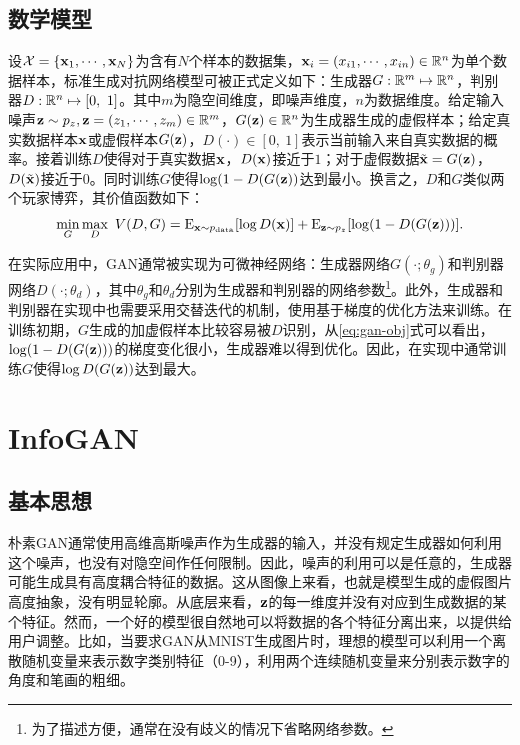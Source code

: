 \subsection{数学模型}
设$\mathcal{X} = \{\mathbf{x}_1, \cdots, \mathbf{x}_N\}$为含有$N$个样本的数据集，$\mathbf{x}_i = (x_{i1}, \cdots, x_{in}) \in \mathbb{R}^n$为单个数据样本，标准生成对抗网络模型可被正式定义如下：生成器$G: \mathbb{R}^m \mapsto \mathbb{R}^n$，判别器$D: \mathbb{R}^n \mapsto [0, ~1]$。其中$m$为隐空间维度，即噪声维度，$n$为数据维度。给定输入噪声$\mathbf{z} \sim p_z, \mathbf{z} = (z_1, \cdots, z_m) \in \mathbb{R}^m$，$G(\mathbf{z}) \in \mathbb{R}^n$为生成器生成的虚假样本；给定真实数据样本$\mathbf{x}$或虚假样本$G(\mathbf{z})$，$D(\cdot) \in [0,~1]$表示当前输入来自真实数据的概率。接着训练$D$使得对于真实数据$\mathbf{x}$，$D(\mathbf{x})$接近于$1$；对于虚假数据$\tilde{\mathbf{x}} = G(\mathbf{z})$，$D(\tilde{\mathbf{x}})$接近于$0$。同时训练$G$使得$\log(1 - D(G(\mathbf{z}))$达到最小。换言之，$D$和$G$类似两个玩家博弈，其价值函数如下：
\begin{equation}
  \min_G\max_D ~V(D,G) =
    \text{E}_{\mathbf{x} \sim p_{\text{data}}}[\log D(\mathbf{x})] + 
    \text{E}_{\mathbf{z} \sim p_z}[\log(1-D(G(\mathbf{z})))].
  \label{eq:gan-obj}
\end{equation}

在实际应用中，GAN通常被实现为可微神经网络：生成器网络$G(\cdot; {\theta}_g)$和判别器网络$D(\cdot; {\theta}_d)$，其中${\theta}_g$和${\theta}_d$分别为生成器和判别器的网络参数\footnote{为了描述方便，通常在没有歧义的情况下省略网络参数。}。此外，生成器和判别器在实现中也需要采用交替迭代的机制，使用基于梯度的优化方法来训练。在训练初期，$G$生成的加虚假样本比较容易被$D$识别，从\eqref{eq:gan-obj}式可以看出，$\log(1 - D(G(\mathbf{z})))$的梯度变化很小，生成器难以得到优化。因此，在实现中通常训练$G$使得$\log D(G(\mathbf{z}))$达到最大。

\section{InfoGAN}\label{sec:infogan}
\subsection{基本思想}
朴素GAN通常使用高维高斯噪声作为生成器的输入，并没有规定生成器如何利用这个噪声，也没有对隐空间作任何限制。因此，噪声的利用可以是任意的，生成器可能生成具有高度耦合特征的数据。这从图像上来看，也就是模型生成的虚假图片高度抽象，没有明显轮廓。从底层来看，$\mathbf{z}$的每一维度并没有对应到生成数据的某个特征。然而，一个好的模型很自然地可以将数据的各个特征分离出来，以提供给用户调整。比如，当要求GAN从MNIST\citep{lecun1989backpropagation}生成图片时，理想的模型可以利用一个离散随机变量来表示数字类别特征（0-9），利用两个连续随机变量来分别表示数字的角度和笔画的粗细。

